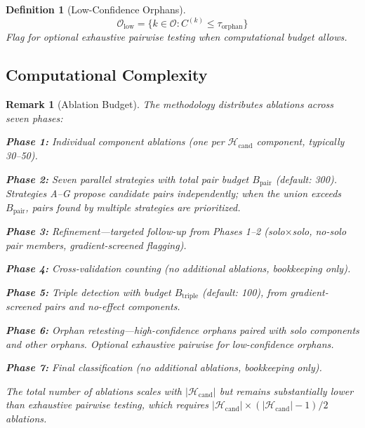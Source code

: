 \documentclass[11pt]{article}
\newtheorem{definition}{Definition}[section]
\newtheorem{remark}{Remark}[section]
\begin{document}
\begin{definition}[Low-Confidence Orphans]
\begin{equation}
\mathcal{O}_{\text{low}} = \{k \in \mathcal{O} : C^{(k)} \leq \tau_{\text{orphan}}\}
\end{equation}
Flag for optional exhaustive pairwise testing when computational budget allows.
\end{definition}

\subsection{Computational Complexity}

\begin{remark}[Ablation Budget]
The methodology distributes ablations across seven phases:

\textbf{Phase 1:} Individual component ablations (one per $\mathcal{H}_{\text{cand}}$ component, typically 30--50).

\textbf{Phase 2:} Seven parallel strategies with total pair budget $B_{\text{pair}}$ (default: 300). Strategies A--G propose candidate pairs independently; when the union exceeds $B_{\text{pair}}$, pairs found by multiple strategies are prioritized.

\textbf{Phase 3:} Refinement---targeted follow-up from Phases 1--2 (solo$\times$solo, no-solo pair members, gradient-screened flagging).

\textbf{Phase 4:} Cross-validation counting (no additional ablations, bookkeeping only).

\textbf{Phase 5:} Triple detection with budget $B_{\text{triple}}$ (default: 100), from gradient-screened pairs and no-effect components.

\textbf{Phase 6:} Orphan retesting---high-confidence orphans paired with solo components and other orphans. Optional exhaustive pairwise for low-confidence orphans.

\textbf{Phase 7:} Final classification (no additional ablations, bookkeeping only).

The total number of ablations scales with $|\mathcal{H}_{\text{cand}}|$ but remains substantially lower than exhaustive pairwise testing, which requires $|\mathcal{H}_{\text{cand}}| \times (|\mathcal{H}_{\text{cand}}| - 1) / 2$ ablations.
\end{remark}
\end{document}
